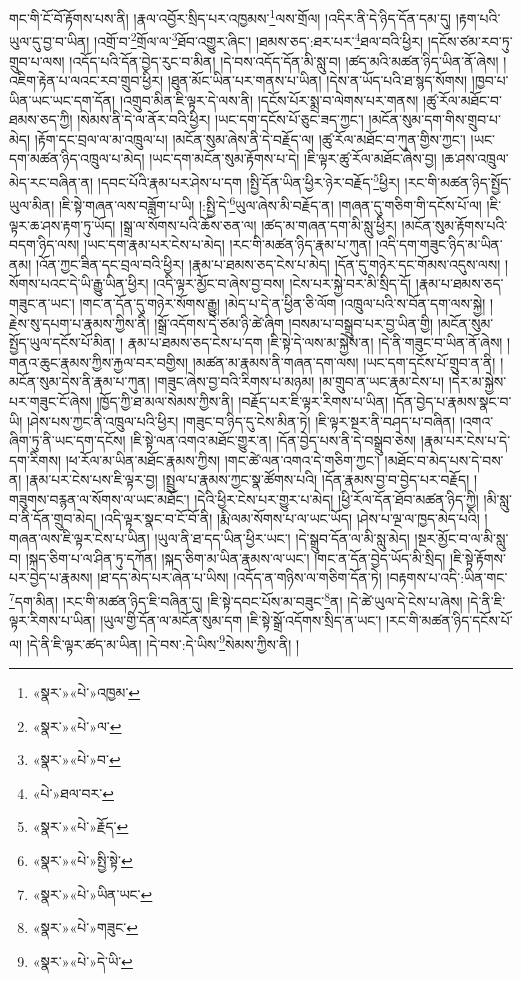 གང་གི་ངོ་བོ་རྟོགས་པས་ནི། །རྣལ་འབྱོར་སྲིད་པར་འཁྱམས་\footnote{«སྣར་»«པེ་»འཁྱམ་}ལས་གྲོལ། །འདིར་ནི་དེ་ཉིད་དོན་དམ་དུ། །རྟག་པའི་ཡུལ་དུ་བྱ་བ་ཡིན། །འགྲོ་བ་\footnote{«སྣར་»«པེ་»ལ་}གྲོལ་ལ་\footnote{«སྣར་»«པེ་»བ་}ཐོབ་འགྱུར་ཞིང་། །ཐམས་ཅད་:ཐར་པར་\footnote{«པེ་»ཐལ་བར་}ཐལ་བའི་ཕྱིར། །དངོས་ཙམ་རབ་ཏུ་གྲུབ་པ་ལས། །འདོད་པའི་དོན་བྱེད་རུང་བ་མིན། །དེ་བས་འདོད་དོན་མི་སླུ་བ། །ཚད་མའི་མཚན་ཉིད་ཡིན་ནོ་ཞེས། །འཇིག་རྟེན་པ་ལའང་རབ་གྲུབ་ཕྱིར། །ཐུན་མོང་ཡིན་པར་གནས་པ་ཡིན། །དེས་ན་ཡོད་པའི་ཐ་སྙད་སོགས། །ཁྱབ་པ་ཡིན་ཡང་ཡང་དག་དོན། །འགྲུབ་མིན་ཇི་ལྟར་དེ་ལས་ནི། །དངོས་པོར་སྨྲ་བ་ལེགས་པར་གནས། །ཚུ་རོལ་མཐོང་བ་ཐམས་ཅད་ཀྱི། །སེམས་ནི་དེ་ལ་ནོར་བའི་ཕྱིར། །ཡང་དག་དངོས་པོ་ཅུང་ཟད་ཀྱང་། །མངོན་སུམ་དག་གིས་གྲུབ་པ་མེད། །རྟོག་དང་བྲལ་ལ་མ་འཁྲུལ་པ། །མངོན་སུམ་ཞེས་ནི་དེ་བརྗོད་ལ། །ཚུ་རོལ་མཐོང་བ་ཀུན་གྱིས་ཀྱང་། །ཡང་དག་མཚན་ཉིད་འཁྲུལ་པ་མེད། །ཡང་དག་མངོན་སུམ་རྟོགས་པ་དེ། །ཇི་ལྟར་ཚུ་རོལ་མཐོང་ཞེས་བྱ། །ཆ་ཤས་འཁྲུལ་མེད་རང་བཞིན་ན། །དབང་པོའི་རྣམ་པར་ཤེས་པ་དག །སྤྱི་དོན་ཡིན་ཕྱིར་ཉེར་བརྗོད་\footnote{«སྣར་»«པེ་»རྗོད་}ཕྱིར། །རང་གི་མཚན་ཉིད་སྤྱོད་ཡུལ་མིན། །ཇི་སྟེ་གཞན་ལས་བཟློག་པ་ཡི། །:སྤྱི་དེ་\footnote{«སྣར་»«པེ་»སྤྱི་སྟེ་}ཡུལ་ཞེས་མི་བརྗོད་ན། །གཞན་དུ་གཅིག་གི་དངོས་པོ་ལ། །ཇི་ལྟར་ཆ་ཤས་རྟག་ཏུ་ཡོད། །སྒྲ་ལ་སོགས་པའི་ཆོས་ཅན་ལ། །ཚད་མ་གཞན་དག་མི་སླུ་ཕྱིར། །མངོན་སུམ་རྟོགས་པའི་བདག་ཉིད་ལས། །ཡང་དག་རྣམ་པར་ངེས་པ་མེད། །རང་གི་མཚན་ཉིད་རྣམ་པ་ཀུན། །འདི་དག་གཟུང་ཉིད་མ་ཡིན་ནམ། །འོན་ཀྱང་ཟིན་དང་བྲལ་བའི་ཕྱིར། །རྣམ་པ་ཐམས་ཅད་ངེས་པ་མེད། །དོན་དུ་གཉེར་དང་གོམས་འདུས་ལས། །སོགས་པའང་དེ་ཡི་རྒྱུ་ཡིན་ཕྱིར། །འདི་ལྟར་མྱོང་བ་ཞེས་བྱ་བས། །ངེས་པར་སྐྱེ་བར་མི་སྲིད་དོ། །རྣམ་པ་ཐམས་ཅད་གཟུང་ན་ཡང་། །གང་ན་དོན་དུ་གཉེར་སོགས་རྒྱུ། །མེད་པ་དེ་ན་ཕྱིན་ཅི་ལོག །འཁྲུལ་པའི་ས་བོན་དག་ལས་སྐྱེ། །རྗེས་སུ་དཔག་པ་རྣམས་ཀྱིས་ནི། །སྒྲོ་འདོགས་དེ་ཙམ་ཉི་ཚེ་ཞིག །བསམ་པ་བསྒྲུབ་པར་བྱ་ཡིན་གྱི། །མངོན་སུམ་སྤྱོད་ཡུལ་དངོས་པོ་མིན། །
རྣམ་པ་ཐམས་ཅད་ངེས་པ་དག །ཇི་སྟེ་དེ་ལས་མ་སྐྱེས་ན། །དེ་ནི་གཟུང་བ་ཡིན་ནོ་ཞེས། །གནའ་ཆུང་རྣམས་ཀྱིས་རྐྱལ་བར་བགྱིས། །མཚན་མ་རྣམས་ནི་གཞན་དག་ལས། །ཡང་དག་དངོས་པོ་གྲུབ་ན་ནི། །མངོན་སུམ་དེས་ནི་རྣམ་པ་ཀུན། །གཟུང་ཞེས་བྱ་བའི་རིགས་པ་མཉམ། །མ་གྲུབ་ན་ཡང་རྣམ་ངེས་པ། །དེར་མ་སྐྱེས་པར་གཟུང་ངོ་ཞེས། །ཁྱོད་ཀྱི་ཐ་མལ་སེམས་ཀྱིས་ནི། །བརྗོད་པར་ཇི་ལྟར་རིགས་པ་ཡིན། །དོན་བྱེད་པ་རྣམས་སྣང་བ་ཡི། །ཤེས་པས་ཀྱང་ནི་འཁྲུལ་པའི་ཕྱིར། །གཟུང་བ་ཉིད་དུ་ངེས་མིན་ཏེ། །ཇི་ལྟར་སྔར་ནི་བཤད་པ་བཞིན། །འགའ་ཞིག་ཏུ་ནི་ཡང་དག་དངོས། །ཇི་སྟེ་ལན་འགའ་མཐོང་གྱུར་ན། །དོན་བྱེད་པས་ནི་དེ་བསྒྲུབ་ཅེས། །རྣམ་པར་ངེས་པ་དེ་དག་རིགས། །ཕ་རོལ་མ་ཡིན་མཐོང་རྣམས་ཀྱིས། །གང་ཚེ་ལན་འགའ་དེ་གཅིག་ཀྱང་། །མཐོང་བ་མེད་པས་དེ་བས་ན། །རྣམ་པར་ངེས་པས་ཇི་ལྟར་བྱ། །སྤྲུལ་པ་རྣམས་ཀྱང་སྣ་ཚོགས་པའི། །དོན་རྣམས་བྱ་བ་བྱེད་པར་བརྗོད། །གཟུགས་བརྙན་ལ་སོགས་ལ་ཡང་མཐོང་། །དེའི་ཕྱིར་ངེས་པར་གྱུར་པ་མེད། །ཕྱི་རོལ་དོན་ཐོབ་མཚན་ཉིད་ཀྱི། །མི་སླུ་བ་ནི་དོན་གྲུབ་མེད། །འདི་ལྟར་སྣང་བ་ངོ་བོ་ནི། །རྨི་ལམ་སོགས་པ་ལ་ཡང་ཡོད། །ཤེས་པ་ལྔ་ལ་ཁྱད་མེད་པའི། །གཞན་ལས་ཇི་ལྟར་ངེས་པ་ཡིན། །ཡུལ་ནི་ཐ་དད་ཡིན་ཕྱིར་ཡང་། །དེ་སྒྲུབ་དོན་ལ་མི་སླུ་མེད། །སྔར་མྱོང་བ་ལ་མི་སླུ་བ། །སྐད་ཅིག་པ་ལ་ཤིན་ཏུ་དཀོན། །སྐད་ཅིག་མ་ཡིན་རྣམས་ལ་ཡང་། །གང་ན་དོན་བྱེད་ཡོད་མི་སྲིད། །ཇི་སྟེ་རྟོགས་པར་བྱེད་པ་རྣམས། །ཐ་དད་མེད་པར་ཞེན་པ་ཡིས། །འདོད་ན་གཉིས་ལ་གཅིག་དོན་ཏེ། །བརྟགས་པ་འདི་:ཡིན་གང་\footnote{«སྣར་»«པེ་»ཡིན་ཡང་}དག་མིན། །རང་གི་མཚན་ཉིད་ཇི་བཞིན་དུ། །ཇི་སྟེ་དབང་པོས་མ་བཟུང་\footnote{«སྣར་»«པེ་»གཟུང་}ན། །དེ་ཚེ་ཡུལ་དེ་ངེས་པ་ཞེས། །དེ་ནི་ཇི་ལྟར་རིགས་པ་ཡིན། །ཡུལ་གྱི་དོན་ལ་མངོན་སུམ་དག །ཇི་སྟེ་སྒྲོ་འདོགས་སྲིད་ན་ཡང་། །རང་གི་མཚན་ཉིད་དངོས་པོ་ལ། །དེ་ནི་ཇི་ལྟར་ཚད་མ་ཡིན། །དེ་བས་:དེ་ཡིས་\footnote{«སྣར་»«པེ་»དེ་ཡི་}སེམས་ཀྱིས་ནི། །
